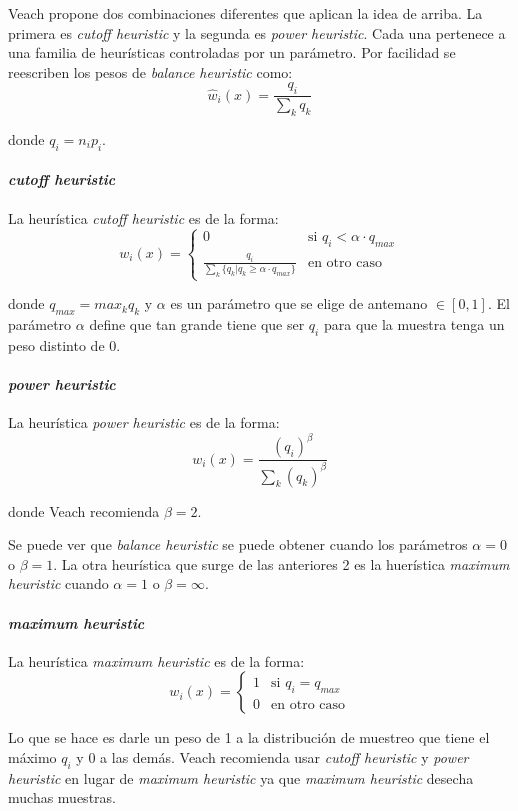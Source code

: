\documentclass{article}
\begin{document}
Veach propone dos combinaciones diferentes que aplican la idea de arriba. La primera es \textit{cutoff heuristic} y la segunda es \textit{power heuristic}.
Cada una pertenece a una familia de heurísticas controladas por un parámetro.
Por facilidad se reescriben los pesos de \textit{balance heuristic} como:
$$ \hat{w}_{i}(x) = \frac{q_{i}}{\sum_{k} q_{k}} $$

donde $q_{i} = n_{i} p_{i}$.

\paragraph{\textit{cutoff heuristic}} La heurística \textit{cutoff heuristic} es de la forma:
$$ w_{i}(x) = \begin{cases} 0 & \text{si } q_{i} < \alpha \cdot q_{max} \\ \frac{q_{i}}{\sum_{k} \{ q_{k} | q_{k} \geq \alpha \cdot q_{max} \}} & \text{en otro caso} \end{cases}$$

donde $q_{max} = max_{k} q_{k}$ y $\alpha$ es un parámetro que se elige de antemano $\in [0, 1]$.
El parámetro $\alpha$ define que tan grande tiene que ser $q_{i}$ para que la muestra tenga un peso distinto de 0.

\paragraph{\textit{power heuristic}} La heurística \textit{power heuristic} es de la forma:
$$ w_{i}(x) = \frac{(q_{i})^{\beta}}{\sum_{k} (q_{k})^{\beta}}$$

donde Veach recomienda $\beta = 2$.

Se puede ver que \textit{balance heuristic} se puede obtener cuando los parámetros $\alpha = 0$ o $\beta = 1$.
La otra heurística que surge de las anteriores 2 es la huerística \textit{maximum heuristic} cuando $\alpha = 1$ o $\beta = \infty$.

\paragraph{\textit{maximum heuristic}} La heurística \textit{maximum heuristic} es de la forma:
$$ w_{i}(x) = \begin{cases} 1 & \text{si } q_{i} = q_{max} \\ 0 & \text{en otro caso} \end{cases}$$

Lo que se hace es darle un peso de 1 a la distribución de muestreo que tiene el máximo $q_{i}$ y 0 a las demás.
Veach recomienda usar \textit{cutoff heuristic} y \textit{power heuristic} en lugar de \textit{maximum heuristic} ya que \textit{maximum heuristic} desecha muchas muestras.
\end{document}

